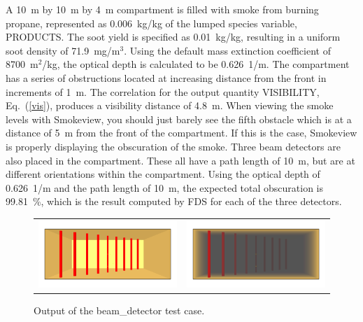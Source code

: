 \documentclass[11pt]{book}
\begin{document}
A 10~m by 10~m by 4~m compartment is filled with smoke from burning propane, represented as 0.006~kg/kg of the lumped species variable, {\ct PRODUCTS}. The soot yield is specified as 0.01~kg/kg, resulting in a uniform soot density of 71.9~mg/m$^3$. Using the default mass extinction coefficient of 8700~m$^2$/kg, the optical depth is calculated to be 0.626~\si{1/m}.  The compartment has a series of obstructions located at increasing distance from the front in increments of 1~m.  The correlation for the output quantity {\ct VISIBILITY}, Eq.~(\ref{vis}), produces a visibility distance of 4.8~m. When viewing the smoke levels with Smokeview, you should just barely see the fifth obstacle which is at a distance of 5~m from the front of the compartment. If this is the case, Smokeview is properly displaying the obscuration of the smoke.  Three beam detectors are also placed in the compartment.  These all have a path length of 10~m, but are at different orientations within the compartment. Using the optical depth of 0.626~\si{1/m} and the path length of 10~m, the expected total obscuration is 99.81~\%, which is the result computed by FDS for each of the three detectors.

\begin{figure}[ht]
\begin{tabular*}{\textwidth}{lr}
\includegraphics[width=3.2in]{SCRIPT_FIGURES/beam_detector_nosmoke} &
\includegraphics[width=3.2in]{SCRIPT_FIGURES/beam_detector_smoke}
\end{tabular*}
\caption[Results of the {\ct beam\_detector} test case]{Output of the {\ct beam\_detector} test case.}
\label{beam_detector}
\end{figure}
\end{document}
